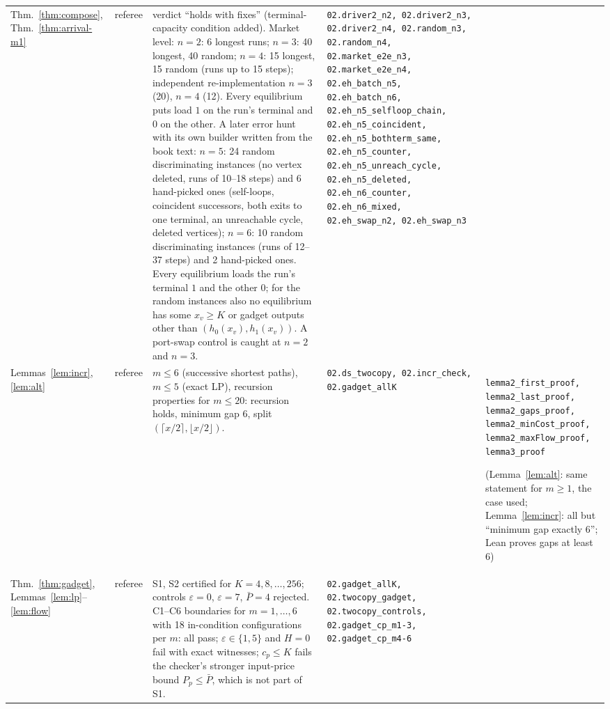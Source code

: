 \begin{longtable}{@{}p{2.7cm}p{1.1cm}p{4.2cm}p{3.75cm}p{3.05cm}@{}}
Thm.~\ref{thm:compose}, Thm.~\ref{thm:arrival-m1} & referee & verdict ``holds with fixes'' (terminal-capacity condition added). Market level: $n=2$: 6 longest runs; $n=3$: 40 longest, 40 random; $n=4$: 15 longest, 15 random (runs up to 15 steps); independent re-implementation $n=3$ (20), $n=4$ (12). Every equilibrium puts load $1$ on the run's terminal and $0$ on the other. A later error hunt with its own builder written from the book text: $n=5$: 24 random discriminating instances (no vertex deleted, runs of 10--18 steps) and 6 hand-picked ones (self-loops, coincident successors, both exits to one terminal, an unreachable cycle, deleted vertices); $n=6$: 10 random discriminating instances (runs of 12--37 steps) and 2 hand-picked ones. Every equilibrium loads the run's terminal $1$ and the other $0$; for the random instances also no equilibrium has some $x_v\ge K$ or gadget outputs other than $(h_0(x_v),h_1(x_v))$. A port-swap control is caught at $n=2$ and $n=3$. & {\scriptsize\raggedright\texttt{02.driver2\_n2,\allowbreak{} 02.driver2\_n3,\allowbreak{} 02.driver2\_n4,\allowbreak{} 02.random\_n3,\allowbreak{} 02.random\_n4,\allowbreak{} 02.market\_e2e\_n3,\allowbreak{} 02.market\_e2e\_n4,\allowbreak{} 02.eh\_batch\_n5,\allowbreak{} 02.eh\_batch\_n6,\allowbreak{} 02.eh\_n5\_selfloop\_chain,\allowbreak{} 02.eh\_n5\_coincident,\allowbreak{} 02.eh\_n5\_bothterm\_same,\allowbreak{} 02.eh\_n5\_counter,\allowbreak{} 02.eh\_n5\_unreach\_cycle,\allowbreak{} 02.eh\_n5\_deleted,\allowbreak{} 02.eh\_n6\_counter,\allowbreak{} 02.eh\_n6\_mixed,\allowbreak{} 02.eh\_swap\_n2,\allowbreak{} 02.eh\_swap\_n3}\par} & \textemdash{}\\
Lemmas~\ref{lem:incr}, \ref{lem:alt} & referee & $m\le6$ (successive shortest paths), $m\le5$ (exact LP), recursion properties for $m\le20$: recursion holds, minimum gap $6$, split $(\lceil x/2\rceil,\lfloor x/2\rfloor)$. & {\scriptsize\raggedright\texttt{02.ds\_twocopy,\allowbreak{} 02.incr\_check,\allowbreak{} 02.gadget\_allK}\par} & {\scriptsize\raggedright\texttt{lemma2\_first\_proof,\allowbreak{} lemma2\_last\_proof,\allowbreak{} lemma2\_gaps\_proof,\allowbreak{} lemma2\_minCost\_proof,\allowbreak{} lemma2\_maxFlow\_proof,\allowbreak{} lemma3\_proof}} {\scriptsize(Lemma~\ref{lem:alt}: same statement for $m\ge1$, the case used; Lemma~\ref{lem:incr}: all but ``minimum gap exactly 6''; Lean proves gaps at least 6)}\\
Thm.~\ref{thm:gadget}, Lemmas~\ref{lem:lp}--\ref{lem:flow} & referee & S1, S2 certified for $K=4,8,\dots,256$; controls $\varepsilon=0$, $\varepsilon=7$, $\bar P=4$ rejected. C1--C6 boundaries for $m=1,\dots,6$ with 18 in-condition configurations per $m$: all pass; $\varepsilon\in\{1,5\}$ and $H=0$ fail with exact witnesses; $c_p\le K$ fails the checker's stronger input-price bound $P_p\le \bar P$, which is not part of S1. & {\scriptsize\raggedright\texttt{02.gadget\_allK,\allowbreak{} 02.twocopy\_gadget,\allowbreak{} 02.twocopy\_controls,\allowbreak{} 02.gadget\_cp\_m1-3,\allowbreak{} 02.gadget\_cp\_m4-6}\par} & \textemdash{}\\

\end{longtable}
